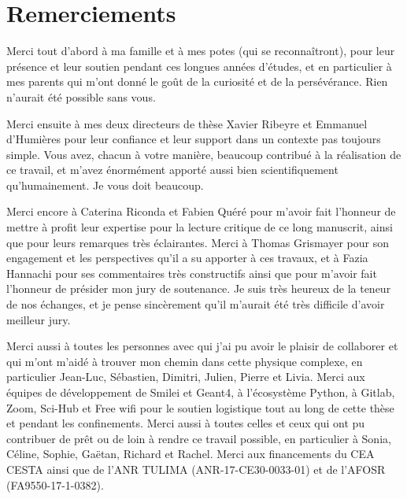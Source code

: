 \documentclass[11pt]{book}
\author{\BXnom}
\title{\BXsujet}
\begin{document}
\frontmatter

\BXcouverture

\chapter*{Remerciements}
Merci tout d'abord à ma famille et à mes potes (qui se reconnaîtront), pour leur présence et leur soutien pendant ces longues années d'études, et en particulier à mes parents qui m'ont donné le goût de la curiosité et de la persévérance. Rien n'aurait été possible sans vous.

\vspace{.3cm}

Merci ensuite à mes deux directeurs de thèse Xavier Ribeyre et Emmanuel d'Humières pour leur confiance et leur support dans un contexte pas toujours simple. Vous avez, chacun à votre manière, beaucoup contribué à la réalisation de ce travail, et m'avez énormément apporté aussi bien scientifiquement qu'humainement. Je vous doit beaucoup.

\vspace{.3cm}

Merci encore à Caterina Riconda et Fabien Quéré pour m'avoir fait l'honneur de mettre à profit leur expertise pour la lecture critique de ce long manuscrit, ainsi que pour leurs remarques très éclairantes. Merci à Thomas Grismayer pour son engagement et les perspectives qu'il a su apporter à ces travaux, et à Fazia Hannachi pour ses commentaires très constructifs ainsi que pour m'avoir fait l'honneur de présider mon jury de soutenance. Je suis très heureux de la teneur de nos échanges, et je pense sincèrement qu'il m'aurait été très difficile d'avoir meilleur jury.

\vspace{.3cm}

Merci aussi à toutes les personnes avec qui j'ai pu avoir le plaisir de collaborer et qui m'ont m'aidé à trouver mon chemin dans cette physique complexe, en particulier Jean-Luc, Sébastien, Dimitri, Julien, Pierre et Livia. Merci aux équipes de développement de Smilei et Geant4, à l'écosystème Python, à Gitlab, Zoom, Sci-Hub et Free wifi pour le soutien logistique tout au long de cette thèse et pendant les confinements.
Merci aussi à toutes celles et ceux qui ont pu contribuer de prêt ou de loin à rendre ce travail possible, en particulier à Sonia, Céline, Sophie, Gaëtan, Richard et Rachel. Merci aux financements du CEA CESTA ainsi que de l'ANR TULIMA (ANR-17-CE30-0033-01) et de l'AFOSR (FA9550-17-1-0382).
\end{document}

